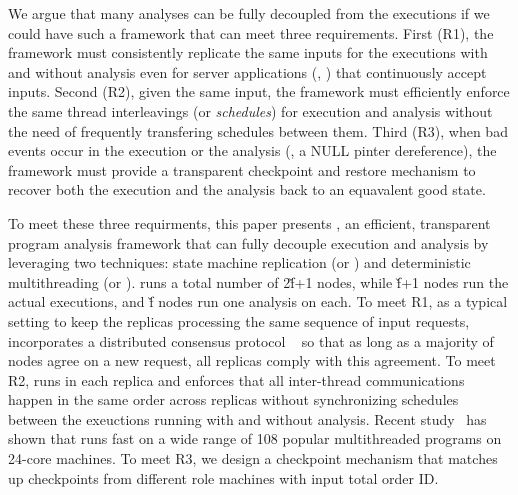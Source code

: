 

We argue that many analyses can be fully decoupled from the executions if 
we could have such a framework that can meet three requirements. First (R1), 
the framework must consistently replicate the same inputs for the executions 
with and without analysis even for server applications (\eg, \apache) that 
continuously accept inputs. Second (R2), given the same input, the framework 
must efficiently enforce the same thread interleavings (or \emph{schedules}) 
for execution and analysis without the need of frequently transfering schedules 
between them. Third (R3), when bad events occur in the execution or the 
analysis (\eg, a NULL pinter dereference), the framework must provide a 
transparent checkpoint and restore mechanism to recover both the execution and 
the analysis back to an equavalent good state.


To meet these three requirments, this paper presents \xxx, an efficient, 
transparent program analysis framework that can fully decouple execution and 
analysis by leveraging two techniques: state machine replication (or \smr) and 
deterministic multithreading (or \dmt). \xxx runs a total number of 2\v{f}+1 
nodes, while \v{f}+1 nodes run the actual executions, and \v{f} nodes run one 
analysis on each. To meet R1, as a typical \smr setting to keep the replicas 
processing the same sequence of input requests, \xxx incorporates a distributed 
consensus protocol \paxos~\cite{paxos} so that as long as a majority of nodes 
agree on a new request, all replicas comply with this agreement. To meet R2, 
\dmt runs in each replica and enforces that all inter-thread communications 
happen in the same order across replicas without synchronizing schedules between 
the exeuctions running with and without analysis. Recent 
study~\cite{parrot:sosp13} has shown that \dmt runs fast on a 
wide range of 108 popular multithreaded programs on 24-core machines. To meet 
R3, we design a checkpoint mechanism that matches up checkpoints from different 
role machines with input total order ID.


